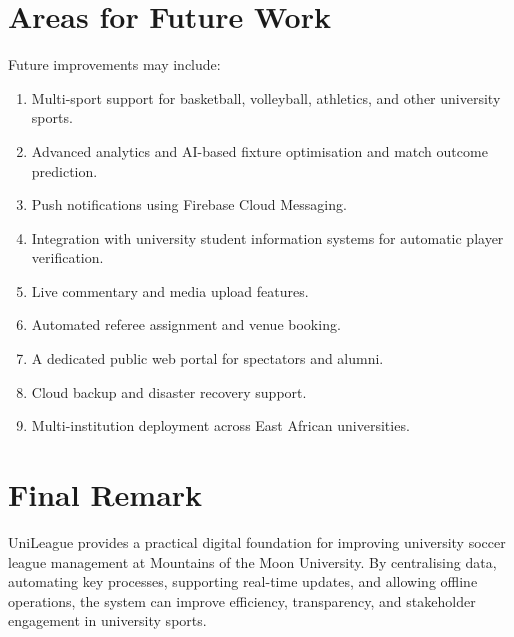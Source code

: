 \documentclass[12pt,a4paper]{report}
\begin{document}
\section{Areas for Future Work}
Future improvements may include:
\begin{enumerate}
  \item Multi-sport support for basketball, volleyball, athletics, and other university sports.
  \item Advanced analytics and AI-based fixture optimisation and match outcome prediction.
  \item Push notifications using Firebase Cloud Messaging.
  \item Integration with university student information systems for automatic player verification.
  \item Live commentary and media upload features.
  \item Automated referee assignment and venue booking.
  \item A dedicated public web portal for spectators and alumni.
  \item Cloud backup and disaster recovery support.
  \item Multi-institution deployment across East African universities.
\end{enumerate}

\section{Final Remark}
UniLeague provides a practical digital foundation for improving university soccer league
management at Mountains of the Moon University. By centralising data, automating key
processes, supporting real-time updates, and allowing offline operations, the system can
improve efficiency, transparency, and stakeholder engagement in university sports.
\end{document}
